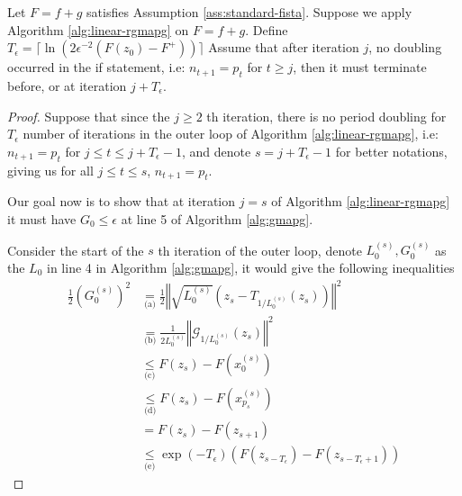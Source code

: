 \documentclass[12pt]{report}
\begin{document}
        \begin{lemma}\label{lemma:rgmapg-outer-itr-bnd}
            Let $F = f + g$ satisfies Assumption \ref{ass:standard-fista}. 
            Suppose we apply Algorithm \ref{alg:linear-rgmapg} on $F = f + g$. 
            Define $T_\epsilon = \lceil\ln(2\epsilon^{-2}(F(z_0) - F^+))\rceil$
            Assume that after iteration $j$, no doubling occurred in the if statement, i.e: $n_{t + 1} = p_t$ for $t \ge j$, then it must terminate before, or at iteration $j + T_\epsilon$. 
        \end{lemma}
        \begin{proof}
            Suppose that since the $j\ge 2$ th iteration, there is no period doubling for $T_\epsilon$ number of iterations in the outer loop of Algorithm \ref{alg:linear-rgmapg}, i.e: $n_{t + 1} = p_t$
            for $j \le t \le j + T_\epsilon - 1$, and denote $s = j + T_\epsilon -1$ for better notations, giving us for all $j \le t \le s$, $n_{t + 1} = p_t$. 
            \par
            Our goal now is to show that at iteration $j = s$ of Algorithm \ref{alg:linear-rgmapg} it must have $G_0 \le \epsilon$ at line 5 of Algorithm \ref{alg:gmapg}. 
            \par
            Consider the start of the $s$ th iteration of the outer loop, denote $L_0^{(s)}, G_0^{(s)}$ as the $L_0$ in line 4 in Algorithm \ref{alg:gmapg}, it would give the following inequalities
            {\allowdisplaybreaks
            \begin{align*}
                \frac{1}{2}\left(
                    G_0^{(s)}
                \right)^2
                &\underset{\text{(a)}}{=} 
                \frac{1}{2}\left\Vert
                    \sqrt{L_0^{(s)}}\left(z_s - T_{1/L_0^{(s)}}(z_s)\right)
                \right\Vert^2
                \\
                &\underset{\text{(b)}}{=} \frac{1}{2L_0^{(s)}}\left\Vert
                        \mathcal G_{1/L_0^{(s)}}(z_s)
                \right\Vert^2
                \\
                &\underset{\text{(c)}}{\le} F(z_s) - F\left(x_0^{(s)}\right) 
                \\
                &\underset{\text{(d)}}{\le} 
                F(z_s) - F\left(x_{p_s}^{(s)}\right)
                \\
                &= F(z_s) - F(z_{s + 1})
                \\
                &\underset{\text{(e)}}{\le} \exp(-T_\epsilon)\left(F(z_{s - T_\epsilon}) - F(z_{s - T_\epsilon + 1})\right)

\end{align*}}
\end{proof}
\end{document}
